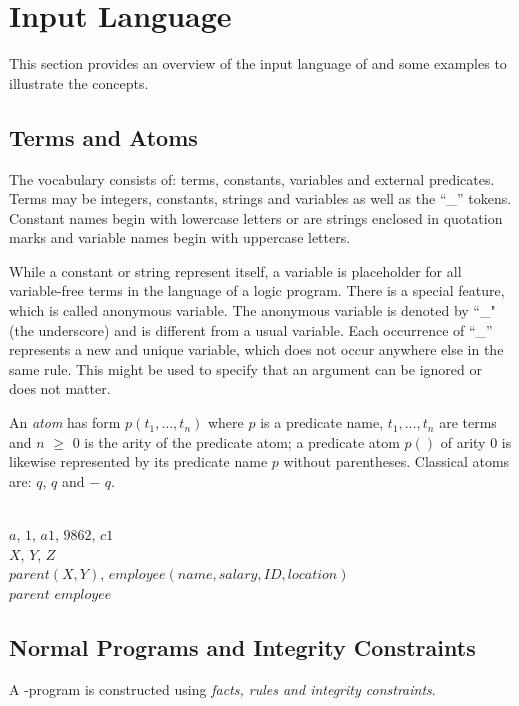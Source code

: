 \documentclass[14pt,a4paper, titlepage]{article}
\begin{document}
\section{Input Language}%
\label{sec:inputLang}
This section provides an overview of the input language of 
\dlvhex{} and some examples to illustrate the concepts. 

\subsection{Terms and Atoms}
The vocabulary consists of: terms, constants, variables and 
external predicates. Terms may be integers, constants, 
strings and variables as well as the \enquote{\_} tokens. 
Constant names begin with lowercase letters or are strings 
enclosed in quotation marks and variable names begin with 
uppercase letters.

While a constant or string represent itself, a variable is 
placeholder for all variable-free terms in the language of 
a logic program. There is a special feature, which is 
called anonymous variable. The anonymous variable is 
denoted by ``\_" (the underscore) and is different from a 
usual variable. Each occurrence of \enquote{\_} represents 
a new and unique variable, which does not occur anywhere 
else in the same rule. This might be used to specify that 
an argument can be ignored or does not matter.

An \emph{atom} has form $\mathit{p(t_1,\dots,t_n)}$ where 
$p$ is a predicate name, $t_1,\dots,t_n$ are terms and $n$ 
$\geq$ $0$ is the arity of the predicate atom; a predicate 
atom $p()$ of arity 0 is likewise represented by its 
predicate name $p$ without parentheses. Classical atoms 
are: $q$, $q$ and $-$ $q$.

\begin{exmp}
\text{   }
\\  $a$, $1$, $\mathit{a1}$, 
$\mathit{9862}$, $\mathit{c1}$
\\  $X$, $Y$, $Z$
\\  $\mathit{parent}(X,Y)$, $\mathit{employee}
(name, salary, ID, location)$
\\  $\mathit{parent}$ $\mathit{employee}$
\end{exmp}
\subsection{Normal Programs and Integrity Constraints}
A \hex{}-program is constructed using \emph{facts, rules 
and integrity constraints}. 
\end{document}
